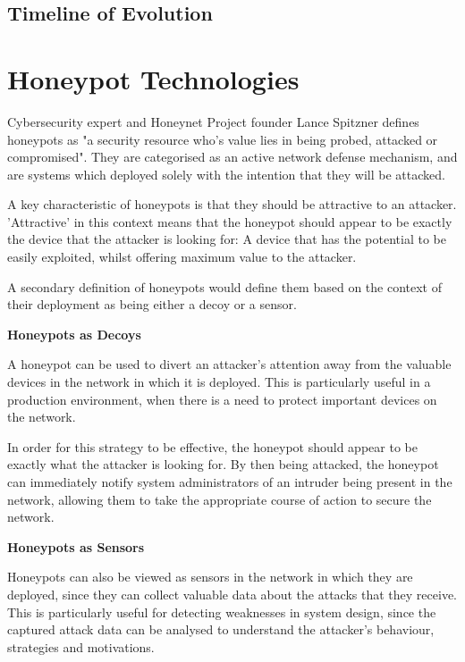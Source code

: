 \subsection{Timeline of Evolution}








\section{Honeypot Technologies}

Cybersecurity expert and Honeynet Project founder Lance Spitzner defines honeypots as "a security resource who's value lies in being probed, attacked or compromised". They are categorised as an active network defense mechanism, and are systems which deployed solely with the intention that they will be attacked. 

A key characteristic of honeypots is that they should be attractive to an attacker. 'Attractive' in this context means that the honeypot should appear to be exactly the device that the attacker is looking for: A device that has the potential to be easily exploited, whilst offering maximum value to the attacker.

A secondary definition of honeypots would define them based on the context of their deployment as being either a decoy or a sensor.

\bullet \textbf{Honeypots as Decoys}

A honeypot can be used to divert an attacker’s attention away from the valuable devices in the network in which it is deployed. This is particularly useful in a production environment, when there is a need to protect important devices on the network. 

In order for this strategy to be effective, the honeypot should appear to be exactly what the attacker is looking for. By then being attacked, the honeypot can immediately notify system administrators of an intruder being present in the network, allowing them to take the appropriate course of action to secure the network.

\bullet \textbf{Honeypots as Sensors}

Honeypots can also be viewed as sensors in the network in which they are deployed, since they can collect valuable data about the attacks that they receive. This is particularly useful for detecting weaknesses in system design, since the captured attack data can be analysed to understand the attacker’s behaviour, strategies and motivations.

